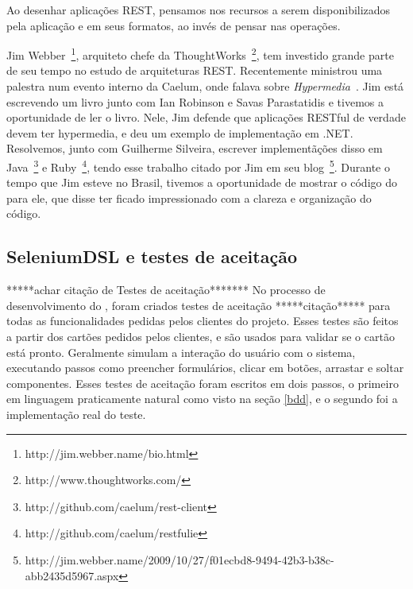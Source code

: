 Ao desenhar aplicações REST, pensamos nos recursos a serem disponibilizados pela aplicação e em seus formatos, ao invés de
pensar nas operações.

Jim Webber~\footnote{http://jim.webber.name/bio.html}, arquiteto chefe da ThoughtWorks~\footnote{http://www.thoughtworks.com/},
tem investido grande parte de seu tempo no estudo de arquiteturas REST. Recentemente ministrou uma palestra num evento interno
da Caelum, onde falava sobre \textit{Hypermedia}~\cite{rest-jim}.
Jim está escrevendo um livro junto com Ian Robinson e Savas Parastatidis e tivemos a oportunidade de ler o livro. Nele, Jim 
defende que aplicações RESTful de verdade devem ter hypermedia, e deu um exemplo de implementação em .NET. Resolvemos, junto com
Guilherme Silveira, escrever implementãções disso em Java~\footnote{http://github.com/caelum/rest-client} e 
Ruby~\footnote{http://github.com/caelum/restfulie}, tendo esse trabalho citado por Jim em seu 
blog~\footnote{http://jim.webber.name/2009/10/27/f01ecbd8-9494-42b3-b38c-abb2435d5967.aspx}.
Durante o tempo que Jim esteve no Brasil, tivemos a oportunidade de mostrar o código do \calopsita para ele, que disse ter
ficado impressionado com a clareza e organização do código.

\subsection{SeleniumDSL e testes de aceitação}
*****achar citação de Testes de aceitação*******
No processo de desenvolvimento do \calopsita, foram criados testes de aceitação *****citação***** para todas as
funcionalidades pedidas pelos clientes do projeto. Esses testes são feitos a partir dos cartões pedidos pelos clientes,
e são usados para validar se o cartão está pronto. Geralmente simulam a interação do usuário com o sistema, executando
passos como preencher formulários, clicar em botões, arrastar e soltar componentes. Esses testes de aceitação
foram escritos em dois passos, o primeiro em linguagem praticamente natural como visto na seção \ref{bdd}, e o segundo
foi a implementação real do teste.

